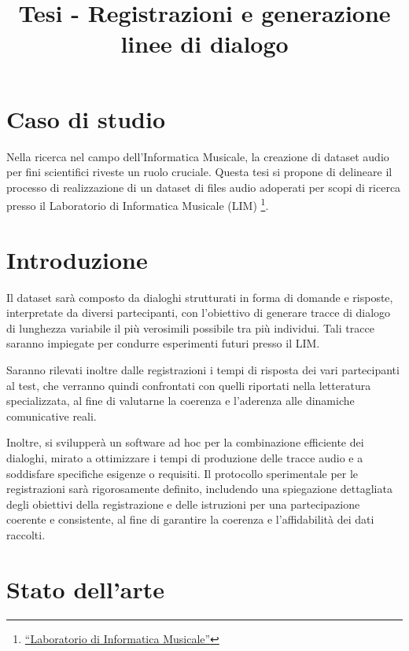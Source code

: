 \documentclass[
]{article}
\title{Tesi - Registrazioni e generazione linee di dialogo}
\author{}
\date{}
\begin{document}
\maketitle

{
\setcounter{tocdepth}{2}
\tableofcontents
}
\section{Caso di studio}\label{caso-di-studio}

Nella ricerca nel campo dell'Informatica Musicale, la creazione di dataset audio per fini scientifici riveste un ruolo cruciale. Questa tesi si propone di delineare il processo di realizzazione di un dataset di files audio adoperati per scopi di ricerca presso il Laboratorio di Informatica Musicale (LIM) \footnote{\href{https://www.lim.di.unimi.it/}{``Laboratorio di Informatica Musicale''}}.

\section{Introduzione}\label{introduzione}

Il dataset sarà composto da dialoghi strutturati in forma di domande e risposte, interpretate da diversi partecipanti, con l'obiettivo di generare tracce di dialogo di lunghezza variabile il più verosimili possibile tra più individui. Tali tracce saranno impiegate per condurre esperimenti futuri presso il LIM.

Saranno rilevati inoltre dalle registrazioni i tempi di risposta dei vari partecipanti al test, che verranno quindi confrontati con quelli riportati nella letteratura specializzata, al fine di valutarne la coerenza e l'aderenza alle dinamiche comunicative reali.

Inoltre, si svilupperà un software ad hoc per la combinazione efficiente dei dialoghi, mirato a ottimizzare i tempi di produzione delle tracce audio e a soddisfare specifiche esigenze o requisiti. Il protocollo sperimentale per le registrazioni sarà rigorosamente definito, includendo una spiegazione dettagliata degli obiettivi della registrazione e delle istruzioni per una partecipazione coerente e consistente, al fine di garantire la coerenza e l'affidabilità dei dati raccolti.

\section{Stato dell'arte}\label{stato-dellarte}
\end{document}
